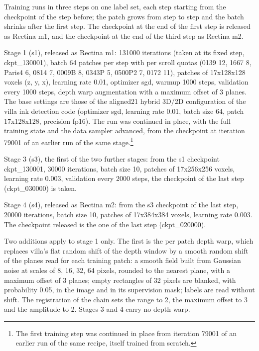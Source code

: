 Training runs in three steps on one label set, each step starting from the checkpoint of the step before; the patch grows from step to step and the batch shrinks after the first step. The checkpoint at the end of the first step is released as Rectina m1, and the checkpoint at the end of the third step as Rectina m2.

Stage 1 (s1), released as Rectina m1: 131000 iterations (taken at its fixed step, ckpt\_130001), batch 64 patches per step with per scroll quotas (0139 12, 1667 8, Paris4 6, 0814 7, 0009B 8, 0343P 5, 0500P2 7, 0172 11), patches of 17x128x128 voxels (z, y, x), learning rate 0.01, optimizer sgd, warmup 1000 steps, validation every 1000 steps, depth warp augmentation with a maximum offset of 3 planes. The base settings are those of the aligned21 hybrid 3D/2D configuration of the villa ink detection code (optimizer sgd, learning rate 0.01, batch size 64, patch 17x128x128, precision fp16). The run was continued in place, with the full training state and the data sampler advanced, from the checkpoint at iteration 79001 of an earlier run of the same stage.\footnote{The first training step was continued in place from iteration 79001 of an earlier run of the same recipe, itself trained from scratch.}

Stage 3 (s3), the first of the two further stages: from the s1 checkpoint ckpt\_130001, 30000 iterations, batch size 10, patches of 17x256x256 voxels, learning rate 0.003, validation every 2000 steps, the checkpoint of the last step (ckpt\_030000) is taken.

Stage 4 (s4), released as Rectina m2: from the s3 checkpoint of the last step, 20000 iterations, batch size 10, patches of 17x384x384 voxels, learning rate 0.003. The checkpoint released is the one of the last step (ckpt\_020000).

Two additions apply to stage 1 only. The first is the per patch depth warp, which replaces villa's flat random shift of the depth window by a smooth random shift of the planes read for each training patch: a smooth field built from Gaussian noise at scales of 8, 16, 32, 64 pixels, rounded to the nearest plane, with a maximum offset of 3 planes; empty rectangles of 32 pixels are blanked, with probability 0.05, in the image and in its supervision mask; labels are read without shift. The registration of the chain sets the range to 2, the maximum offset to 3 and the amplitude to 2. Stages 3 and 4 carry no depth warp.

